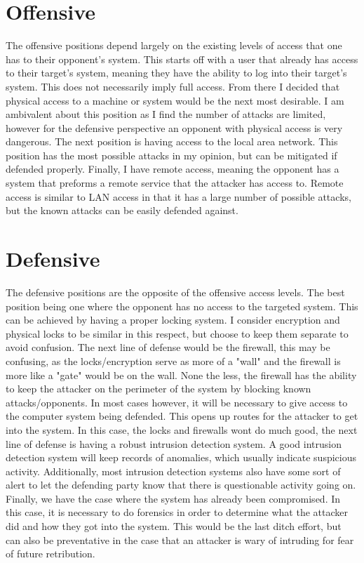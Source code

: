 \documentclass{article}
\begin{document}
\section{Offensive}
The offensive positions depend largely on the existing levels of access that one has to their opponent's system. This starts off with a user that already has access to their target's system, meaning they have the ability to log into their target's system. This does not necessarily imply full access. From there I decided that physical access to a machine or system would be the next most desirable.  I am ambivalent about this position as I find the number of attacks are limited, however for the defensive perspective an opponent with physical access is very dangerous. The next position is having access to the local area network. This position has the most possible attacks in my opinion, but can be mitigated if defended properly. Finally, I have remote access, meaning the opponent has a system that preforms a remote service that the attacker has access to. Remote access is similar to LAN access in that it has a large number of possible attacks, but the known attacks can be easily defended against. 
\section{Defensive}
The defensive positions are the opposite of the offensive access levels. The best position being one where the opponent has no access to the targeted system. This can be achieved by having a proper locking system. I consider encryption and physical locks to be similar in this respect, but choose to keep them separate to avoid confusion. The next line of defense would be the firewall, this may be confusing, as the locks/encryption serve as more of a "wall" and the firewall is more like a "gate" would be on the wall. None the less, the firewall has the ability to keep the attacker on the perimeter of the system by blocking known attacks/opponents. In most cases however, it will be necessary to give access to the computer system being defended. This opens up routes for the attacker to get into the system. In this case, the locks and firewalls wont do much good, the next line of defense is having a robust intrusion detection system. A good intrusion detection system will keep records of anomalies, which usually indicate suspicious activity. Additionally, most intrusion detection systems also have some sort of alert to let the defending party know that there is questionable activity going on. Finally, we have the case where the system has already been compromised. In this case, it is necessary to do forensics in order to determine what the attacker did and how they got into the system. This would be the last ditch effort, but can also be preventative in the case that an attacker is wary of intruding for fear of future retribution. 
\end{document}
